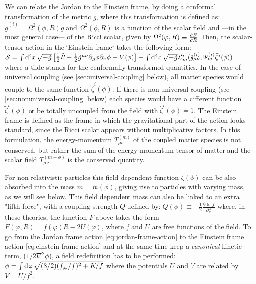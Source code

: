 We can relate the Jordan to the Einstein frame, by doing a conformal transformation of the metric $g$, where
this transformation is defined as:
\beeqc$
\tilde{g}^{(i)} = \Omega^2(\phi, R) g
$
and $\Omega^2(\phi, R)$ is a function of the scalar field and ---in the most general case--- of the Ricci scalar, given by
\beeqp$
\Omega^2(\varphi,R) \equiv \frac{\partial{F}}{\partial{R}} 
$
Then, the scalar-tensor action in the `Einstein-frame` takes the following form:
\beeqc$\label{eq:einstein-frame-action}
\mathcal{S} = \int \mathrm{d}^{4} {x} \, \sqrt{-\tilde{g}} \left[  \frac{1}{2} \tilde{R} - \frac{1}{2} \tilde{g}^{\mu \nu}  \partial_{\mu}\phi \partial_{\nu}\phi 
- V(\phi)    \right] - \int \mathrm{d}^{4} {x} \, \sqrt{-\tilde{g}} \mathcal{L}^i_m (\tilde{g}^{(i)}_{\mu \nu} , 
\varPsi_m^{(i)} \tilde{\zeta}^{i}(\phi) )
$
where a tilde stands for the conformally transformed quantities.
In the case of universal coupling (see \cref{sec:universal-coupling} below), all matter species would couple to the same function $\tilde{\zeta}^{i}(\phi)$. 
If there is non-universal coupling (see \cref{sec:nonuniversal-coupling} below) each species would
have a different function $\tilde{\zeta}^{i}(\phi)$ or be totally uncoupled from the
field with $\tilde{\zeta}^{i}(\phi) = 1$. 
The Einstein frame is defined as the 
frame in which the gravitational part of the action looks standard, since the Ricci scalar appears without multiplicative factors.
In this formulation, the energy-momentum $T^{(m)}_{\mu \nu}$ of the coupled matter species is not conserved, but rather
the sum of the energy momentum tensor of matter and the scalar field $T^{(m+\phi)}_{\mu \nu}$ is the conserved quantity.

For non-relativistic particles this field dependent function $\zeta(\phi)$ can be also absorbed into the mass $m=m(\phi)$, giving rise to particles with varying mass, as we will see below.
This field dependent mass can also be linked to an extra "fifth-force", 
with a coupling strength $Q$
defined by:
\beeqc$\label{eq:definition-of-coupling-Q}
Q(\phi) \equiv -\frac{1}{2}\frac{\partial \ln f}{\partial \phi}
$
where, in these theories, the function $F$ above takes the form: $F(\varphi, R) = f(\varphi)R-2U(\varphi)$, where
$f$ and $U$ are free functions of the field.
To go from the Jordan frame action \cref{eq:jordan-frame-action} to the Einstein frame action
\cref{eq:einstein-frame-action} and at the same time keep a \emph{canonical} kinetic term,
($1/2 \nabla^2 \phi$), a field redefinition has to be performed:
\beeq$
\phi = \int \mathrm{d}^{} {\varphi} \, \sqrt{(3/2)(f_{,\varphi}/f)^2 + K/f}
$
where the potentials $U$ and $V$ are related by $V = U/f^2$.


